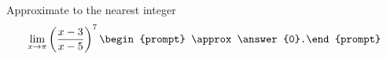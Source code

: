 \documentclass[handout]{ximera}
\author{Gregory Hartman \and Matthew Carr}
\begin{document}
\begin{exercise}




Approximate to the nearest integer
\[
\lim_{x\to\pi}
\left(
\frac{x-3}{x-5}
\right)^7
\begin{prompt}
\approx   \answer{0}.%
\end{prompt}
\]
\end{exercise}
\end{document}
